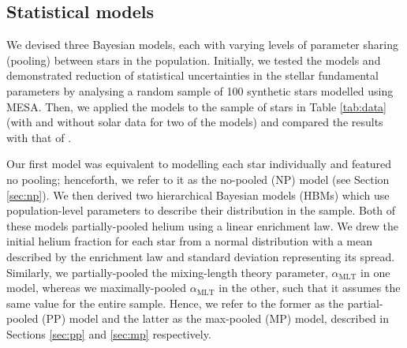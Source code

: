 \documentclass[a4paper,fleqn,usenatbib]{mnras}
\newcommand{\mlt}{\ensuremath{{\alpha_\mathrm{MLT}}}}
\begin{document}

\subsection{Statistical models}\label{sec:hbm}

We devised three Bayesian models, each with varying levels of parameter sharing (pooling) between stars in the population. Initially, we tested the models and demonstrated reduction of statistical uncertainties in the stellar fundamental parameters by analysing a random sample of 100 synthetic stars modelled using \textsc{MESA}. Then, we applied the models to the sample of stars in Table \ref{tab:data} (with and without solar data for two of the models) and compared the results with that of .

Our first model was equivalent to modelling each star individually and featured no pooling; henceforth, we refer to it as the no-pooled (NP) model (see Section \ref{sec:np}). We then derived two hierarchical Bayesian models (HBMs) which use population-level parameters to describe their distribution in the sample. Both of these models partially-pooled helium using a linear enrichment law. We drew the initial helium fraction for each star from a normal distribution with a mean described by the enrichment law and standard deviation representing its spread. Similarly, we partially-pooled the mixing-length theory parameter, $\mlt$ in one model, whereas we maximally-pooled $\mlt$ in the other, such that it assumes the same value for the entire sample. Hence, we refer to the former as the partial-pooled (PP) model and the latter as the max-pooled (MP) model, described in Sections \ref{sec:pp} and \ref{sec:mp} respectively.
\end{document}
